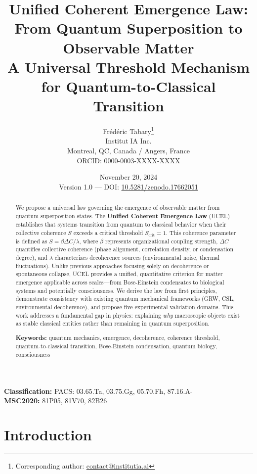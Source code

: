 \documentclass[12pt,a4paper]{article}
\title{\textbf{Unified Coherent Emergence Law:}\\
\textbf{From Quantum Superposition to Observable Matter}\\
\large A Universal Threshold Mechanism for Quantum-to-Classical Transition}
\author{
    Frédéric Tabary\thanks{Corresponding author: \href{mailto:contact@institutia.ai}{contact@institutia.ai}} \\
    \small Institut🦋IA Inc. \\
    \small Montreal, QC, Canada / Angers, France \\
    \small ORCID: 0000-0003-XXXX-XXXX
}
\date{November 20, 2024\\
\small Version 1.0 --- DOI: \href{https://doi.org/10.5281/zenodo.17662051}{10.5281/zenodo.17662051}}
\begin{document}
\maketitle

\begin{abstract}
We propose a universal law governing the emergence of observable matter from quantum superposition states. The \textbf{Unified Coherent Emergence Law} (UCEL) establishes that systems transition from quantum to classical behavior when their collective coherence $S$ exceeds a critical threshold $S_{\text{crit}} = 1$. This coherence parameter is defined as $S = \beta \Delta C / \lambda$, where $\beta$ represents organizational coupling strength, $\Delta C$ quantifies collective coherence (phase alignment, correlation density, or condensation degree), and $\lambda$ characterizes decoherence sources (environmental noise, thermal fluctuations). Unlike previous approaches focusing solely on decoherence or spontaneous collapse, UCEL provides a unified, quantitative criterion for matter emergence applicable across scales---from Bose-Einstein condensates to biological systems and potentially consciousness. We derive the law from first principles, demonstrate consistency with existing quantum mechanical frameworks (GRW, CSL, environmental decoherence), and propose five experimental validation domains. This work addresses a fundamental gap in physics: explaining \emph{why} macroscopic objects exist as stable classical entities rather than remaining in quantum superposition.

\vspace{0.3cm}
\noindent \textbf{Keywords:} quantum mechanics, emergence, decoherence, coherence threshold, quantum-to-classical transition, Bose-Einstein condensation, quantum biology, consciousness
\end{abstract}

\vspace{0.5cm}
\noindent \textbf{Classification:} PACS: 03.65.Ta, 03.75.Gg, 05.70.Fh, 87.16.A- \\
\textbf{MSC2020:} 81P05, 81V70, 82B26

\clearpage

\tableofcontents
\clearpage

\section{Introduction}
\end{document}
